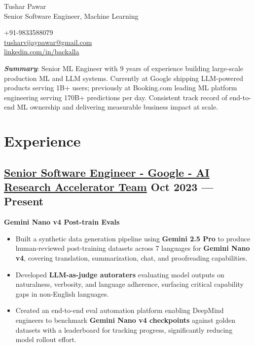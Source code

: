 \documentclass[a4,10pt]{article}
\newenvironment{zitemize}{
\begin{itemize}\itemsep0pt \parskip0pt \parsep1pt}
{\end{itemize}\vspace{-0.5cm}}
\newcommand{\hrole}[2]{{\fontsize{11}{12}\selectfont \textbf{\underline{#1}}  \hfill{#2}}}
\newcommand{\hprojectname}[1]{\vspace{0.4cm}\noindent\textbf{#1}\vspace{-0.1cm}}
\begin{document}
\begin{center}
    \begin{minipage}[b]{0.65\textwidth}
            \raggedright
            {\fontsize{32}{38}\selectfont Tushar Pawar} \\ %
            \vspace{0.2cm}
            {\color{UI_blue} \Large{Senior Software Engineer, Machine Learning}} \\
    \end{minipage}%
    \begin{minipage}[b]{0.35\textwidth}
            \flushright \large
            +91-9833588079 \\
            \href{mailto:tusharvijaypawar@gmail.com}{tusharvijaypawar@gmail.com} \\
            {\href{https://www.linkedin.com/in/backalla/}{linkedin.com/in/backalla} }
    \end{minipage}

\vspace{-0.15cm}
{\color{UI_blue} \hrulefill}
\end{center}

\noindent\textit{\textbf{Summary}}: Senior ML Engineer with 9 years of experience building large-scale production ML and LLM systems. Currently at Google shipping LLM-powered products serving 1B+ users; previously at Booking.com leading ML platform engineering serving 170B+ predictions per day. Consistent track record of end-to-end ML ownership and delivering measurable business impact at scale.
\section{Experience}
\subsection{\hrole{Senior Software Engineer - Google - AI Research Accelerator Team}{Oct 2023 --- Present}}

    \hprojectname{Gemini Nano v4 Post-train Evals}
    \begin{zitemize}
        \item Built a synthetic data generation pipeline using \textbf{Gemini 2.5 Pro} to produce human-reviewed post-training datasets across 7 languages for \textbf{Gemini Nano v4}, covering translation, summarization, chat, and proofreading capabilities.
        \item Developed \textbf{LLM-as-judge autoraters} evaluating model outputs on naturalness, verbosity, and language adherence, surfacing critical capability gaps in non-English languages.
        \item Created an end-to-end eval automation platform enabling DeepMind engineers to benchmark \textbf{Gemini Nano v4 checkpoints} against golden datasets with a leaderboard for tracking progress, significantly reducing model rollout effort.
    \end{zitemize}
\end{document}
